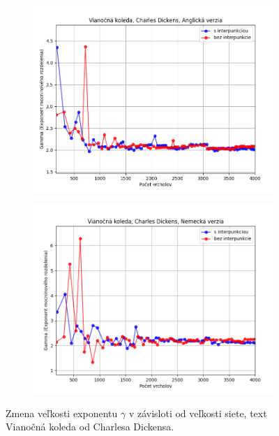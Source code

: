 \begin{figure}[htbp]
    \centering
    \begin{subfigure}[b]{0.9\textwidth}
        \includegraphics[width=\textwidth]{images/Growth/Screenshot_13.png}
    \end{subfigure}

    \vspace{0.3cm}

    \begin{subfigure}[b]{0.9\textwidth}
        \includegraphics[width=\textwidth]{images/Growth/Screenshot_14.png}
    \end{subfigure}
    
    \vspace{0.3cm}
    \caption{Zmena veľkosti exponentu $\gamma$ v závisloti od veľkosti siete, text Vianočná koleda od Charlesa Dickensa.}\label{fig:growthKoleda}
\end{figure}

